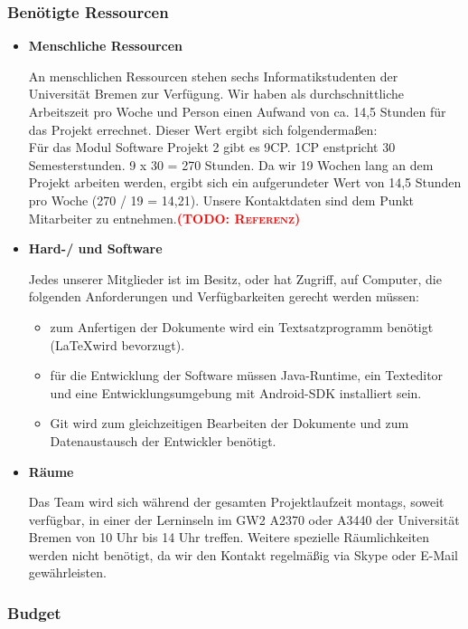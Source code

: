 \documentclass[fontsize=12pt,paper=a4,twoside]{scrartcl}
\newcommand{\todo}[1]{\textbf{\textsc{\textcolor{red}{(TODO: #1)}}}}
\begin{document}
\subsubsection{Benötigte Ressourcen}

\begin{itemize}
\item \textbf{Menschliche Ressourcen}

An menschlichen Ressourcen stehen sechs Informatikstudenten der Universität Bremen zur Verfügung. Wir haben als durchschnittliche Arbeitszeit pro Woche und Person einen Aufwand von ca. 14,5 Stunden für das Projekt errechnet. Dieser Wert ergibt sich folgendermaßen:\\
Für das Modul Software Projekt 2 gibt es 9CP. 1CP enstpricht 30 Semesterstunden. 9 x 30 = 270 Stunden. Da wir 19 Wochen lang an dem Projekt arbeiten werden, ergibt sich ein aufgerundeter Wert von 14,5 Stunden pro Woche (270 / 19 = 14,21). Unsere Kontaktdaten sind dem Punkt Mitarbeiter zu entnehmen.\todo{Referenz}

\item \textbf{Hard-/ und Software}

Jedes unserer Mitglieder ist im Besitz, oder hat Zugriff, auf Computer, die folgenden Anforderungen und Verfügbarkeiten gerecht werden müssen:

\begin{itemize}
\item zum Anfertigen der Dokumente wird ein Textsatzprogramm benötigt (\LaTeX wird bevorzugt).
\item für die Entwicklung der Software müssen Java-Runtime, ein Texteditor und eine Entwicklungsumgebung mit Android-SDK installiert sein.
\item Git wird zum gleichzeitigen Bearbeiten der Dokumente und zum Datenaustausch der Entwickler benötigt.
\end{itemize}

\item \textbf{Räume}

Das Team wird sich während der gesamten Projektlaufzeit montags, soweit verfügbar, in einer der Lerninseln im GW2 A2370 oder A3440 der Universität Bremen von 10 Uhr bis 14 Uhr treffen. Weitere spezielle Räumlichkeiten werden nicht benötigt, da wir den Kontakt regelmäßig via Skype oder E-Mail gewährleisten.

\end{itemize}

\subsubsection{Budget}
\end{document}
